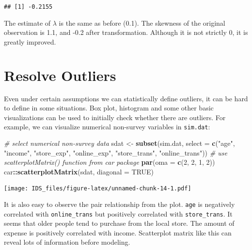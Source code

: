 \documentclass[12pt,]{krantz}
\makeatletter
\newenvironment{Shaded}{\begin{snugshade}}{\end{snugshade}}
\newcommand{\CommentTok}[1]{\textcolor[rgb]{0.37,0.37,0.37}{\textit{#1}}}
\newcommand{\DataTypeTok}[1]{\textcolor[rgb]{0.27,0.27,0.27}{#1}}
\newcommand{\DecValTok}[1]{\textcolor[rgb]{0.06,0.06,0.06}{#1}}
\newcommand{\KeywordTok}[1]{\textcolor[rgb]{0.27,0.27,0.27}{\textbf{#1}}}
\newcommand{\NormalTok}[1]{#1}
\newcommand{\OperatorTok}[1]{\textcolor[rgb]{0.43,0.43,0.43}{\textbf{#1}}}
\newcommand{\OtherTok}[1]{\textcolor[rgb]{0.37,0.37,0.37}{#1}}
\newcommand{\StringTok}[1]{\textcolor[rgb]{0.5,0.5,0.5}{#1}}
\newenvironment{kframe}{%
\medskip{}
\setlength{\fboxsep}{.8em}
 \def\at@end@of@kframe{}%
 \ifinner\ifhmode%
  \def\at@end@of@kframe{\end{minipage}}%
  \begin{minipage}{\columnwidth}%
 \fi\fi%
 \def\FrameCommand##1{\hskip\@totalleftmargin \hskip-\fboxsep
 \colorbox{shadecolor}{##1}\hskip-\fboxsep
     \hskip-\linewidth \hskip-\@totalleftmargin \hskip\columnwidth}%
 \MakeFramed {\advance\hsize-\width
   \@totalleftmargin\z@ \linewidth\hsize
   \@setminipage}}%
 {\par\unskip\endMakeFramed%
 \at@end@of@kframe}
\renewenvironment{Shaded}{\begin{kframe}}{\end{kframe}}
\makeatother
\begin{document}
\begin{verbatim}
## [1] -0.2155
\end{verbatim}

The estimate of \(\lambda\) is the same as before (0.1). The skewness of the original observation is 1.1, and -0.2 after transformation. Although it is not strictly 0, it is greatly improved.

\hypertarget{outliers}{%
\section{Resolve Outliers}\label{outliers}}

Even under certain assumptions we can statistically define outliers, it can be hard to define in some situations. Box plot, histogram and some other basic visualizations can be used to initially check whether there are outliers. For example, we can visualize numerical non-survey variables in \texttt{sim.dat}:

\begin{Shaded}
\begin{Highlighting}[]
\CommentTok{# select numerical non-survey data}
\NormalTok{sdat <-}\StringTok{ }\KeywordTok{subset}\NormalTok{(sim.dat, }\DataTypeTok{select =} \KeywordTok{c}\NormalTok{(}\StringTok{"age"}\NormalTok{, }\StringTok{"income"}\NormalTok{, }\StringTok{"store_exp"}\NormalTok{, }
    \StringTok{"online_exp"}\NormalTok{, }\StringTok{"store_trans"}\NormalTok{, }\StringTok{"online_trans"}\NormalTok{))}
\CommentTok{# use scatterplotMatrix() function from car package}
\KeywordTok{par}\NormalTok{(}\DataTypeTok{oma =} \KeywordTok{c}\NormalTok{(}\DecValTok{2}\NormalTok{, }\DecValTok{2}\NormalTok{, }\DecValTok{1}\NormalTok{, }\DecValTok{2}\NormalTok{))}
\NormalTok{car}\OperatorTok{::}\KeywordTok{scatterplotMatrix}\NormalTok{(sdat, }\DataTypeTok{diagonal =} \OtherTok{TRUE}\NormalTok{)}
\end{Highlighting}
\end{Shaded}

\texttt{[image: IDS\_files/figure-latex/unnamed-chunk-14-1.pdf]}

It is also easy to observe the pair relationship from the plot. \texttt{age} is negatively correlated with \texttt{online\_trans} but positively correlated with \texttt{store\_trans}. It seems that older people tend to purchase from the local store. The amount of expense is positively correlated with income. Scatterplot matrix like this can reveal lots of information before modeling.
\end{document}
